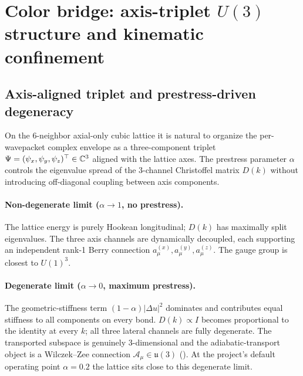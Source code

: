 \section{Color bridge: axis-triplet $U(3)$ structure and kinematic confinement}
\label{sec:color}

\subsection{Axis-aligned triplet and prestress-driven degeneracy}
\label{subsec:axis-triplet}

On the 6-neighbor axial-only cubic lattice it is natural to organize the per-wavepacket complex
envelope as a three-component triplet $\Psi=(\psi_x,\psi_y,\psi_z)^\top\in\mathbb{C}^3$ aligned with the
lattice axes.
The prestress parameter $\alpha$ controls the eigenvalue spread of the 3-channel Christoffel matrix
$D(k)$ without introducing off-diagonal coupling between axis components.

\paragraph{Non-degenerate limit ($\alpha\to 1$, no prestress).}
The lattice energy is purely Hookean longitudinal; $D(k)$ has maximally split eigenvalues.
The three axis channels are dynamically decoupled, each supporting an independent rank-1 Berry
connection $a_\mu^{(x)}, a_\mu^{(y)}, a_\mu^{(z)}$.
The gauge group is closest to $U(1)^3$.

\paragraph{Degenerate limit ($\alpha\to 0$, maximum prestress).}
The geometric-stiffness term $(1-\alpha)|\Delta u|^2$ dominates and contributes equal stiffness to
all components on every bond.
$D(k)\propto I$ becomes proportional to the identity at every $k$; all three lateral channels are
fully degenerate.
The transported subspace is genuinely 3-dimensional and the adiabatic-transport object is a
Wilczek--Zee connection $\mathcal{A}_\mu\in\mathfrak{u}(3)$ ().
At the project's default operating point $\alpha=0.2$ the lattice sits close to this degenerate
limit.

